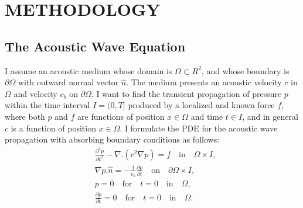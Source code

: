%
%
%
%


\chapter{\uppercase {Methodology}}

\section{The Acoustic Wave Equation}
I  assume an acoustic medium whose domain is $ \Omega \subset R^2$, and whose  boundary is $ \partial \Omega$  with  outward normal vector $\hat{n}$. The medium presents an acoustic velocity $c$ in $ \Omega$ and velocity  $c_b$ on  $ \partial  \Omega$. I want to find the transient propagation of pressure $p$ within the time interval $I=(0,T]$ produced  by a localized and known force $f$, where both $p$ and $f$ are functions of position $x \in \Omega$ and time $t \in I$, and in general $c$  is a function of position $x \in  \Omega$. I formulate the  PDE  for the acoustic wave propagation with absorbing boundary conditions as follows:
\begin{equation} \label{Eq2.1}
\begin{split}
 &\frac {\partial ^2 p} {\partial t^2}  - \nabla . \left(  c^2 \nabla p  \right)  = f   \quad  \textrm{in} \quad \Omega \times I, \\
 &\nabla p . \hat{n} = - \frac{1}{c_b} \frac{\partial p}{\partial t} \quad  \textrm{on} \quad \partial \Omega \times I,\\
 &p = 0  \quad \textrm{for} \quad t=0  \quad \textrm{in}  \quad \Omega, \\
 &\frac{\partial p}{\partial t} = 0 \quad \textrm{for} \quad t=0  \quad \textrm{in} \quad \Omega.
 \end{split}
\end{equation}


